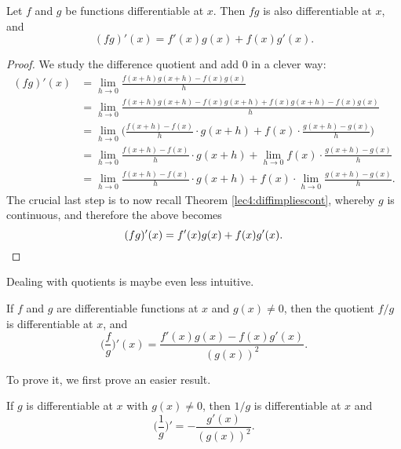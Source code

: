 \begin{theorem}
	Let $f$ and $g$ be functions differentiable at $x$. Then $f g$ is also differentiable at $x$, and
	\[
		(f g)'(x) = f'(x) g(x) + f(x) g'(x).
	\]
\end{theorem}

\begin{proof}
	We study the difference quotient and add $0$ in a clever way:
	\begin{align*}
		(f g)'(x) & = \lim_{h \to 0} \frac{f(x + h) g(x + h) - f(x) g(x)}{h}                                                         \\
		          & = \lim_{h \to 0} \frac{f(x + h) g(x + h) - f(x) g(x + h) + f(x) g(x + h) - f(x) g(x)}{h}                         \\
		          & = \lim_{h \to 0} \Big ( \frac{f(x + h) - f(x)}{h} \cdot g(x + h) + f(x) \cdot \frac{g(x + h) - g(x)}{h} \Big )   \\
		          & = \lim_{h \to 0} \frac{f(x + h) - f(x)}{h} \cdot g(x + h) + \lim_{h \to 0} f(x) \cdot \frac{g(x + h) - g(x)}{h}  \\
		          & = \lim_{h \to 0} \frac{f(x + h) - f(x)}{h} \cdot g(x + h) + f(x) \cdot \lim_{h \to 0} \frac{g(x + h) - g(x)}{h}.
	\end{align*}
	The crucial last step is to now recall Theorem \ref{lec4:diffimpliescont}, whereby $g$ is continuous, and therefore the above becomes
	\[
		(f g)'(x) = f'(x) g(x) + f(x) g'(x). \qedhere
	\]
\end{proof}

\noindent
Dealing with quotients is maybe even less intuitive.

\begin{theorem}
	If $f$ and $g$ are differentiable functions at $x$ and $g(x) \neq 0$, then the quotient $f / g$ is differentiable at $x$, and
	\[
		\Big ( \frac{f}{g} \Big )'(x) = \frac{f'(x) g(x) - f(x) g'(x)}{(g(x))^2}.
	\]
\end{theorem}

\noindent
To prove it, we first prove an easier result.

\begin{lemma}
	If $g$ is differentiable at $x$ with $g(x) \neq 0$, then $1 / g$ is differentiable at $x$ and
	\[
		\Big ( \frac{1}{g} \Big )' = -\frac{g'(x)}{(g(x))^2}.
	\]
\end{lemma}

